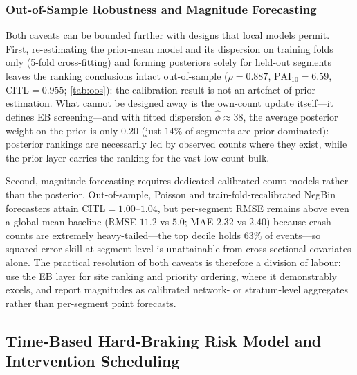 \documentclass[letterpaper,8pt]{extarticle}  %
\begin{document}
\begin{doublespacing}
\begin{linenumbers}


\FloatBarrier


\subsubsection{Out-of-Sample Robustness and Magnitude Forecasting}\label{sec:oos}

Both caveats can be bounded further with designs that local models permit. First, re-estimating the prior-mean model and its dispersion on training folds only (5-fold cross-fitting) and forming posteriors solely for held-out segments leaves the ranking conclusions intact out-of-sample ($\rho=0.887$, $\mathrm{PAI}_{10}=6.59$, CITL$=0.955$; \cref{tab:oos}): the calibration result is not an artefact of prior estimation. What cannot be designed away is the own-count update itself---it defines EB screening---and with fitted dispersion $\hat\phi\approx38$, the average posterior weight on the prior is only $0.20$ (just $14\%$ of segments are prior-dominated): posterior rankings are necessarily led by observed counts where they exist, while the prior layer carries the ranking for the vast low-count bulk.

Second, magnitude forecasting requires dedicated calibrated count models rather than the posterior. Out-of-sample, Poisson and train-fold-recalibrated NegBin forecasters attain CITL$=1.00$--$1.04$, but per-segment RMSE remains above even a global-mean baseline (RMSE $11.2$ vs $5.0$; MAE $2.32$ vs $2.40$) because crash counts are extremely heavy-tailed---the top decile holds $63\%$ of events---so squared-error skill at segment level is unattainable from cross-sectional covariates alone. The practical resolution of both caveats is therefore a division of labour: use the EB layer for site ranking and priority ordering, where it demonstrably excels, and report magnitudes as calibrated network- or stratum-level aggregates rather than per-segment point forecasts.



\FloatBarrier


\subsection{Time-Based Hard-Braking Risk Model and Intervention Scheduling}\label{sec:time-model}


\end{linenumbers}
\end{doublespacing}
\end{document}
